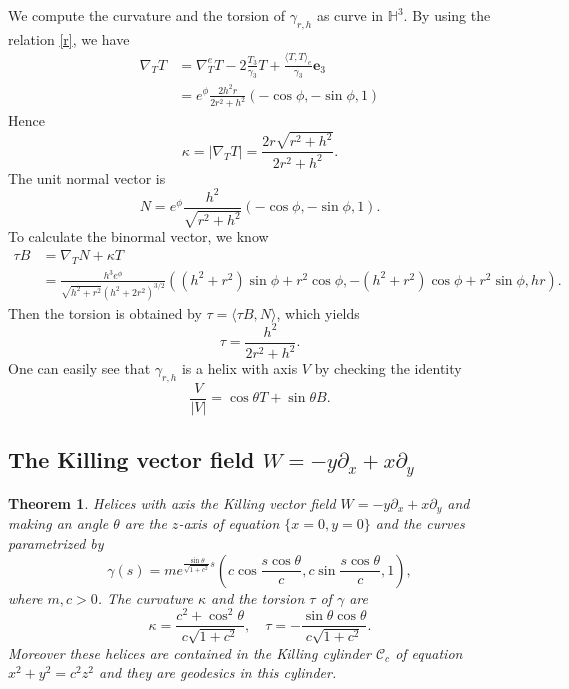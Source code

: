 \documentclass[a4paper,12pt]{amsart}
\newtheorem{theorem}{Theorem}[section]
\theoremstyle{definition}
\def\h{\mathbb H}
\def\e{\mathbf e}
\begin{document}
 We compute the curvature and the torsion of $\gamma_{r,h}$ as curve in $\h^3$. By using the relation \eqref{r}, we have 
\begin{equation*}
\begin{split}
\nabla_TT&=\nabla^e_TT-2\frac{T_3}{\gamma_3}T+\frac{\langle T,T\rangle_e}{\gamma_3}\e_3\\
&=e^{\phi}\frac{2 h^2 r}{ 2 r^2+h^2}\left(-  \cos \phi,- \sin \phi,1\right)
\end{split}
\end{equation*}
  Hence 
  $$\kappa=|\nabla_TT|=\frac{2r\sqrt{r^2+h^2}}{2r^2+h^2}.$$
  The unit normal vector is  
  $$N=e^{\phi}\frac{  h^2}{ \sqrt{r^2+h^2}}\left(-  \cos \phi,- \sin \phi,1\right).$$
  To calculate the binormal vector, we know
  \begin{equation*}
\begin{split}
\tau B&=\nabla_TN+\kappa T\\
  &=\frac{h^3 e^{\phi}}{\sqrt{h^2+r^2} \left(h^2+2 r^2\right)^{3/2}}\left(  (h^2+r^2) \sin \phi+r^2 \cos \phi ,-(h^2+r^2) \cos \phi+r^2 \sin \phi , h  r  \right).
  \end{split}
  \end{equation*}
    Then the torsion is obtained by $\tau=\langle \tau B,N\rangle$, which yields
  $$\tau=\frac{h^2}{2r^2+h^2}.$$
  One can easily see that $\gamma_{r,h}$ is a helix with axis $V$ by checking the identity
  $$\frac{V}{|V|}=\cos\theta T+\sin\theta B.$$
  


  \subsection{The Killing vector field $W= -y\partial_x+x\partial_y$}
  
  
  


 \begin{theorem} \label{t32}
 Helices with axis the Killing vector field $W=-y\partial_x+x\partial_y$  and making an angle $\theta$ are the $z$-axis  of equation $\{x=0,y=0\}$ and the curves parametrized by
  \begin{equation}\label{w0}
 \gamma(s)=me^{\frac{\sin\theta}{\sqrt{1+c^2}}s}\left(c \cos\frac{s\cos\theta}{c},c \sin \frac{s\cos\theta}{c}, 1\right),
 \end{equation}
where $m,c>0$.  The curvature $\kappa$ and the torsion $\tau$ of $\gamma$ are
\begin{equation}\label{h00}
\kappa=\frac{c^2+\cos^2\theta}{c\sqrt{1+c^2}},\quad \tau=-\frac{\sin\theta\cos\theta}{c\sqrt{1+c^2}}.
\end{equation}
Moreover these helices are contained in the Killing cylinder $\mathcal{C}_c$ of equation $x^2+y^2=c^2z^2$ and they are geodesics in this cylinder.
 \end{theorem}
 
\end{document}
